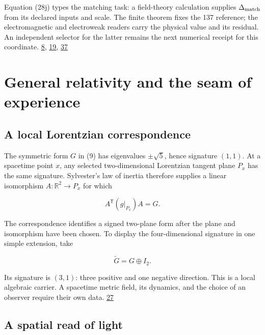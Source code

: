 Equation (28j) types the matching task: a field-theory calculation supplies \(\Delta_{\rm match}\) from its declared inputs and scale. The finite theorem fixes the 137 reference; the electromagnetic and electroweak readers carry the physical value and its residual. An independent selector for the latter remains the next numerical receipt for this coordinate. \href{https://chatgpt.com/library?file_id=libfile_67018da506648191b88970078f33fd1a\&account_id=personal}{8}, \href{https://pdg.lbl.gov/2026/reviews/standard_model_and_related.html}{19}, \href{https://chatgpt.com/library?file_id=libfile_b30993b2ecd48191aab2855fdb3d932e\&account_id=personal}{37}

\hypertarget{general-relativity-and-the-seam-of-experience}{%
\section{General relativity and the seam of experience}\label{general-relativity-and-the-seam-of-experience}}

\hypertarget{a-local-lorentzian-correspondence}{%
\subsection{A local Lorentzian correspondence}\label{a-local-lorentzian-correspondence}}

The symmetric form \(G\) in (9) has eigenvalues \(\pm\sqrt5\), hence signature \((1,1)\). At a spacetime point \(x\), any selected two-dimensional Lorentzian tangent plane \(P_x\) has the same signature. Sylvester's law of inertia therefore supplies a linear isomorphism \(A:\mathbb R^2\to P_x\) for which

\[
A^{\mathsf T}(g|_{P_x})A=G.
\tag{29}
\]

The correspondence identifies a signed two-plane form after the plane and isomorphism have been chosen. To display the four-dimensional signature in one simple extension, take

\[
\widetilde G=G\oplus I_2.
\tag{30}
\]

Its signature is \((3,1)\): three positive and one negative direction. This is a local algebraic carrier. A spacetime metric field, its dynamics, and the choice of an observer require their own data. \href{https://www.cambridge.org/highereducation/books/matrix-analysis/FDA3627DC2B9F5C3DF2FD8C3CC136B48}{27}

\hypertarget{a-spatial-read-of-light}{%
\subsection{A spatial read of light}\label{a-spatial-read-of-light}}

